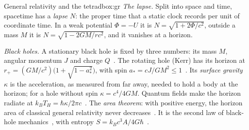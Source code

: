 \begin{primer}{General relativity and the tetrad}{box:gr}
\emph{The lapse.} Split into space and time, spacetime has a \emph{lapse} $N$: the proper time that a static clock records per unit of
coordinate time. In a weak potential $\Phi=-U$ it is $N=\sqrt{1+2\Phi/c^2}$, outside a mass $M$ it is $N=\sqrt{1-2GM/rc^2}$, and it
vanishes at a horizon.

\emph{Black holes.} A stationary black hole is fixed by three numbers: its mass $M$, angular momentum $J$ and charge
$Q$~\cite{israel,kerr}. The rotating hole (Kerr) has its horizon at $r_+=(GM/c^2)\big(1+\sqrt{1-a_*^2}\big)$, with spin
$a_*=cJ/GM^2\le1$~\cite{kerr}. Its \emph{surface gravity} $\kappa$ is the acceleration, as measured from far away, needed to hold a body
at the horizon; for a hole without spin $\kappa=c^4/4GM$. Quantum fields make the horizon radiate at $k_BT_H=\hbar\kappa/2\pi c$~\cite{hawking75}.
The \emph{area theorem}: with positive energy, the horizon area of classical general relativity never decreases~\cite{hawking1971}. It is
the second law of black-hole mechanics~\cite{bch}, with entropy $S=k_Bc^3A/4G\hbar$~\cite{bekenstein73}.
\end{primer}
